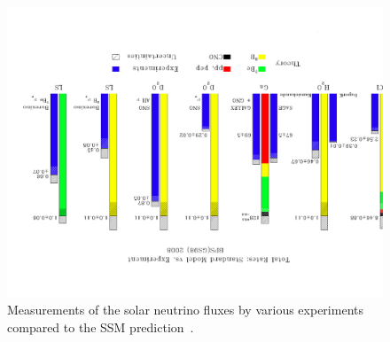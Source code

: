\begin{figure}[htbp]
\centering
\includegraphics[angle=180,width=0.8\linewidth]{figures/theoryvsexpsnu1.pdf}
  \caption{
Measurements of the solar neutrino fluxes by various experiments compared to the SSM prediction~\cite{serenellif}.
}
 \label{fig:sol-theoryexp}
 \end{figure}



